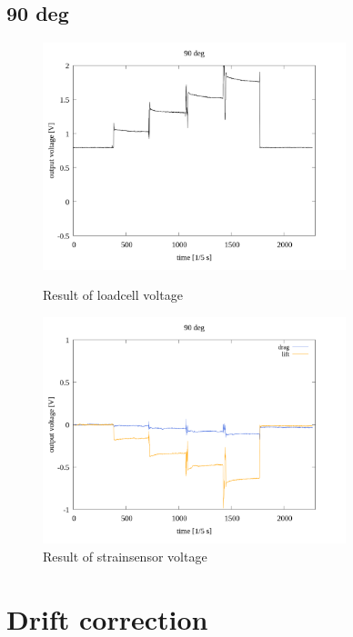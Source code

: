 \documentclass[twocolumn,a4j]{jsarticle}
\begin{document}
\subsection{90 deg}
\begin{figure}[htbp]
    \footnotesize
    \begin{center}
        \includegraphics[width=88mm]{../images/reverse/90_loadcell.png}
        \caption{Result of loadcell voltage}
        \includegraphics[width=88mm]{../images/reverse/90_strainsensor.png}
        \caption{Result of strainsensor voltage}
    \end{center}
\end{figure}

\newpage
\section{Drift correction}
\end{document}
